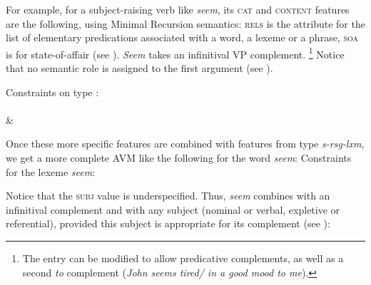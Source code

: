 \documentclass[output=paper
	        ,collection
	        ,collectionchapter
 	        ,biblatex
                ,babelshorthands
                ,newtxmath
                ,draftmode
                ,colorlinks, citecolor=brown
]{langscibook}
\begin{document}
For example, for a subject-raising verb like \emph{seem}, its \textsc{cat} and \textsc{content} features are the following, using Minimal Recursion semantics: \textsc{rels} is the attribute for the list of elementary predications associated with a word, a lexeme or a phrase, \textsc{soa} is for state-of-affair (see ). \emph{Seem} takes an infinitival VP complement.%
%
\footnote{The entry can be modified to allow predicative complements, as well as a second \emph{to} complement (\emph{John seems tired/ in a good mood to me}).}
%
Notice that no semantic role is assigned to the first argument (see ).

\ea\label{ex:prop23}
Constraints on type :\\
 \impl \\
 \&\\
\z

Once these more specific features are combined with features from type \emph{s-rsg-lxm}, we get a more complete AVM like the following for the word \emph{seem}:
\ea\label{ex:prop24}
Constraints for the lexeme \emph{seem}:\\
\z

Notice that the \textsc{subj} value is underspecified. Thus, \emph{seem} combines with an infinitival complement and with any subject (nominal or verbal, expletive or referential), provided this subject is appropriate for its complement (see ):
\end{document}
